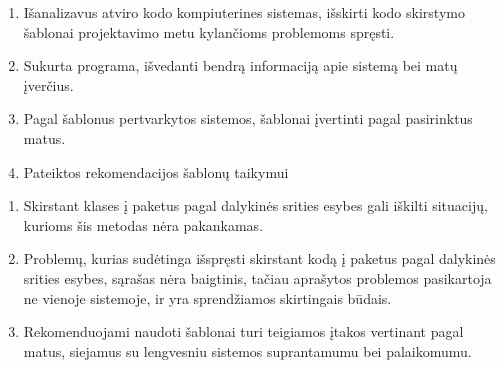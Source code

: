 \documentclass[
]{VUMIFPSbakalaurinis}
\begin{document}
\tableofcontents






%


\begin{enumerate}
    \item Išanalizavus atviro kodo kompiuterines sistemas, išskirti kodo skirstymo šablonai projektavimo metu kylančioms problemoms spręsti.
    \item Sukurta programa, išvedanti bendrą informaciją apie sistemą bei matų įverčius.
    \item Pagal šablonus pertvarkytos sistemos, šablonai įvertinti pagal pasirinktus matus.
    \item Pateiktos rekomendacijos šablonų taikymui
\end{enumerate}

\begin{enumerate}[labelindent=0pt]
    \item Skirstant klases į paketus pagal dalykinės srities esybes gali iškilti situacijų, kurioms šis metodas nėra pakankamas.
    \item Problemų, kurias sudėtinga išspręsti skirstant kodą į paketus pagal dalykinės srities esybes, sąrašas nėra baigtinis, tačiau
    aprašytos problemos pasikartoja ne vienoje sistemoje, ir yra sprendžiamos skirtingais būdais.
    \item Rekomenduojami naudoti šablonai turi teigiamos įtakos vertinant pagal matus, siejamus su lengvesniu sistemos suprantamumu bei palaikomumu.
\end{enumerate}

\printbibliography[heading=bibintoc]  %

%
\end{document}
